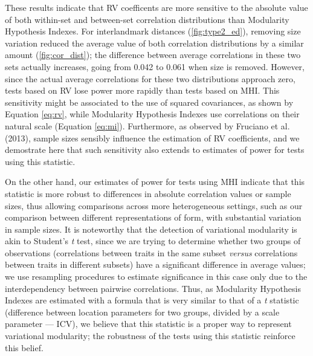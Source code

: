 \documentclass[12pt,]{article}
\begin{document}
These results indicate that RV coefficents are more sensitive to the
absolute value of both within-set and between-set correlation
distributions than Modularity Hypothesis Indexes. For interlandmark
distances (\autoref{fig:type2_ed}), removing size variation reduced the
average value of both correlation distributions by a similar amount
(\autoref{fig:cor_dist}); the difference between average correlations in
these two sets actually increases, going from 0.042 to 0.061 when size
is removed. However, since the actual average correlations for these two
distributions approach zero, tests based on RV lose power more rapidly
than tests based on MHI. This sensitivity might be associated to the use
of squared covariances, as shown by Equation \ref{eq:rv}, while
Modularity Hypothesis Indexes use correlations on their natural scale
(Equation \ref{eq:mi}). Furthermore, as observed by Fruciano et al.
(2013), sample sizes sensibly influence the estimation of RV
coefficients, and we demostrate here that such sensitivity also extends
to estimates of power for tests using this statistic.

On the other hand, our estimates of power for tests using MHI indicate
that this statistic is more robust to differences in absolute
correlation values or sample sizes, thus allowing comparisons across
more heterogeneous settings, such as our comparison between different
representations of form, with substantial variation in sample sizes. It
is noteworthy that the detection of variational modularity is akin to
Student's \emph{t} test, since we are trying to determine whether two
groups of observations (correlations between traits in the same subset
\emph{versus} correlations between traits in different subsets) have a
significant difference in average values; we use resampling procedures
to estimate significance in this case only due to the interdependency
between pairwise correlations. Thus, as Modularity Hypothesis Indexes
are estimated with a formula that is very similar to that of a \emph{t}
statistic (difference between location parameters for two groups,
divided by a scale parameter --- ICV), we believe that this statistic is
a proper way to represent variational modularity; the robustness of the
tests using this statistic reinforce this belief.
\end{document}
